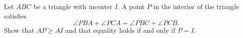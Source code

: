 Let $ABC$ be a triangle with incenter $I$.
A point $P$ in the interior of the triangle satisfies
\[ \angle PBA + \angle PCA = \angle PBC + \angle PCB. \]
Show that $AP \ge AI$ and that equality holds if and only if $P=I$.